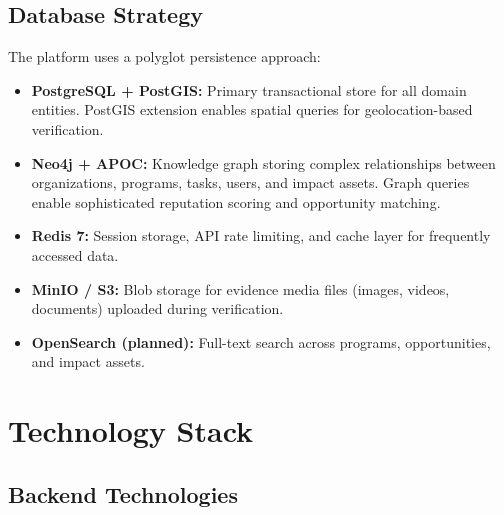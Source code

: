 \subsection{Database Strategy}

The platform uses a polyglot persistence approach:

\begin{itemize}
  \item \textbf{PostgreSQL + PostGIS:} Primary transactional store for all domain entities. PostGIS extension enables spatial queries for geolocation-based verification.
  \item \textbf{Neo4j + APOC:} Knowledge graph storing complex relationships between organizations, programs, tasks, users, and impact assets. Graph queries enable sophisticated reputation scoring and opportunity matching.
  \item \textbf{Redis 7:} Session storage, API rate limiting, and cache layer for frequently accessed data.
  \item \textbf{MinIO / S3:} Blob storage for evidence media files (images, videos, documents) uploaded during verification.
  \item \textbf{OpenSearch (planned):} Full-text search across programs, opportunities, and impact assets.
\end{itemize}

\clearpage

\section{Technology Stack}

\subsection{Backend Technologies}


